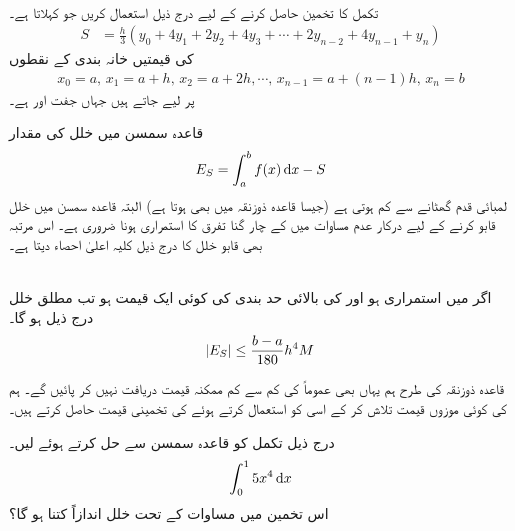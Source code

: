 \\
تکمل  کا تخمین حاصل کرنے کے لیے درج ذیل استعمال کریں جو   کہلاتا ہے۔ 
\begin{align}\label{مساوات_تکمل_قاعدہ_سمسن}
S&=\frac{h}{3}(y_0+4y_1+2y_2+4y_3+\cdots+2y_{n-2}+4y_{n-1}+y_n)
\end{align}
 کی قیمتیں خانہ بندی کے نقطوں
\begin{align*}
x_0=a,\, x_1=a+h,\, x_2=a+2h, \cdots, \, x_{n-1}=a+(n-1)h,\, x_n=b
\end{align*} 
پر لیے جاتے ہیں جہاں  جفت اور  ہے۔

قاعدہ سمسن میں خلل کی مقدار
\begin{align}\label{مساوات_تکمل_قاعدہ_سمسن_خلل_تعریف}
E_S=\int_a^bf(x)\dif x-S
\end{align} 
لمبائی قدم گھٹانے سے کم ہوتی ہے (جیسا قاعدہ ذوزنقہ  میں بھی ہوتا ہے)  البتہ قاعدہ سمسن میں خلل قابو کرنے کے لیے درکار عدم مساوات میں  کے چار   گنا  تفرق کا  استمراری ہونا ضروری ہے۔ اس مرتبہ  بھی قابو خلل کا  درج ذیل کلیہ اعلیٰ احصاء دیتا ہے۔

\\
اگر  میں  استمراری ہو اور  کی بالائی حد بندی کی کوئی ایک قیمت  ہو تب  مطلق خلل درج ذیل ہو گا۔
\begin{align}\label{مساوات_تکمل_قاعدہ_سمسن_خلل}
\abs{E_S}\le \frac{b-a}{180}h^4M
\end{align}

قاعدہ ذوزنقہ کی طرح  ہم یہاں بھی  عموماً  کی کم سے کم ممکنہ  قیمت دریافت نہیں کر پائیں گے۔ ہم  کی کوئی موزوں قیمت تلاش کر کے اسی کو استعمال کرتے ہوئے  کی تخمینی قیمت حاصل کرتے ہیں۔

درج ذیل تکمل کو قاعدہ سمسن سے حل کرتے ہوئے  لیں۔
\begin{align*}
\int_0^1 5x^4\dif x
\end{align*}
اس تخمین میں مساوات  کے تحت خلل اندازاً کتنا ہو گا؟

